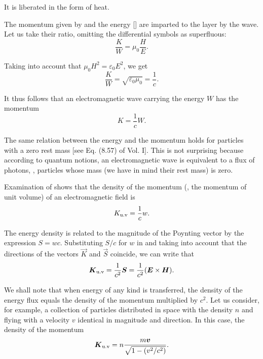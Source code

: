 \noindent
It is liberated in the form of heat.

The momentum given by  and the energy [] are imparted to the layer by the wave.
Let us take their ratio, omitting the differential symbols as superfluous:
\begin{equation*}
    \frac{K}{W} = \mu_0 \frac{H}{E}.
\end{equation*}

\noindent
Taking into account that $\mu_0 H^2=\varepsilon_0 E^2$, we get
\begin{equation*}
    \frac{K}{W} = \sqrt{\varepsilon_0\mu_0} = \frac{1}{c}.
\end{equation*}

\noindent
It thus follows that an electromagnetic wave carrying the energy $W$ has the momentum
\begin{equation}\label{eq:15_35}
    K = \frac{1}{c} W.
\end{equation}

\noindent
The same relation between the energy and the momentum holds for particles with a zero rest mass [see Eq. (8.57) of Vol. I].
This is not surprising because according to quantum notions, an electromagnetic wave is equivalent to a flux of photons, \ie, particles whose mass (we have in mind their rest mass) is zero.

Examination of  shows that the density of the momentum (\ie, the momentum of unit volume) of an electromagnetic field is
\begin{equation}\label{eq:15_36}
    K_{\text{u.v}} = \frac{1}{c} w.
\end{equation}

\noindent
The energy density is related to the magnitude of the Poynting vector by the expression $S = wc$. Substituting $S/c$ for $w$ in  and taking into account that the directions of the vectors $\vec{K}$ and $\vec{S}$ coincide, we can write that
\begin{equation}\label{eq:15_37}
    \boldsymbol{K}_{\text{u.v}} = \frac{1}{c^2} \boldsymbol{S} = \frac{1}{c^2} (\boldsymbol{E}\times\boldsymbol{H}).
\end{equation}

We shall note that when energy of any kind is transferred, the density of the energy flux equals the density of the momentum multiplied by $c^2$.
Let us consider, for example, a collection of particles distributed in space with the density $n$ and flying with a velocity $v$ identical in magnitude and direction.
In this case, the density of the momentum
\begin{equation}\label{eq:15_38}
    \boldsymbol{K}_{\text{u.v}} = n \frac{m\boldsymbol{v}}{\sqrt{1 - \left(v^2/c^2\right)}}.
\end{equation}

